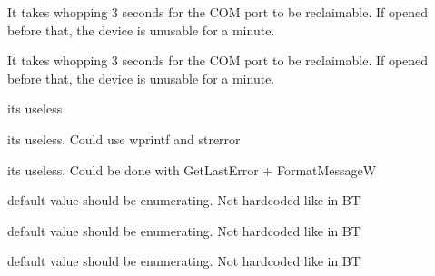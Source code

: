 
\begin{DoxyRefList}
\item[\label{bug__bug000011}%
\hypertarget{bug__bug000011}{}%
global\+Scope$>$ Global \hyperlink{btwin_8c_a66111b994dc31a22f27679a286c338e4}{bt\+\_\+close} (void $\ast$handle)]It takes whopping 3 seconds for the C\+O\+M port to be reclaimable. If opened before that, the device is unusable for a minute.  
\item[\label{bug__bug000011}%
\hypertarget{bug__bug000011}{}%
global\+Scope$>$ Global \hyperlink{btwin_8c_a66111b994dc31a22f27679a286c338e4}{bt\+\_\+close} (void $\ast$handle)]It takes whopping 3 seconds for the C\+O\+M port to be reclaimable. If opened before that, the device is unusable for a minute.  
\item[\label{bug__bug000003}%
\hypertarget{bug__bug000003}{}%
global\+Scope$>$ Global \hyperlink{btserial_8h_ad7be1494a76a1058ec4ba51588a09109}{bt\+\_\+error} (void $\ast$device)]it\textquotesingle{}s useless  
\item[\label{bug__bug000007}%
\hypertarget{bug__bug000007}{}%
global\+Scope$>$ Global \hyperlink{btunix_8c_a91cd0489b6e5dc0973109579ca9c7a55}{bt\+\_\+error} (void $\ast$fd\+\_\+)]it\textquotesingle{}s useless. Could use {\ttfamily wprintf} and {\ttfamily strerror} 

it\textquotesingle{}s useless. Could be done with Get\+Last\+Error + Format\+Message\+W  
\item[\label{bug__bug000004}%
\hypertarget{bug__bug000004}{}%
global\+Scope$>$ Global \hyperlink{btunix_8c_af506b835d8daf62d306f72deec5001ce}{bt\+\_\+open} (const char $\ast$file)]default value should be enumerating. Not hardcoded like in {\ttfamily B\+T} 

default value should be enumerating. Not hardcoded like in {\ttfamily B\+T}  
\item[\label{bug__bug000004}%
\hypertarget{bug__bug000004}{}%
global\+Scope$>$ Global \hyperlink{btunix_8c_af506b835d8daf62d306f72deec5001ce}{bt\+\_\+open} (const char $\ast$file)]default value should be enumerating. Not hardcoded like in {\ttfamily B\+T} 


\end{DoxyRefList}
